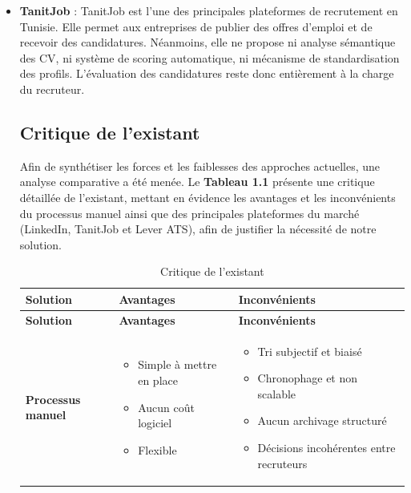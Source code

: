 \documentclass[12pt,a4paper,oneside]{report}
\begin{document}
\begin{itemize}
\item \textbf{TanitJob} : TanitJob \cite{tanitjob} est l'une des principales plateformes de recrutement en Tunisie. Elle permet aux entreprises de publier des offres d'emploi et de recevoir des candidatures. Néanmoins, elle ne propose ni analyse sémantique des CV, ni système de scoring automatique, ni mécanisme de standardisation des profils. L'évaluation des candidatures reste donc entièrement à la charge du recruteur.



\subsection{Critique de l'existant}
Afin de synthétiser les forces et les faiblesses des approches actuelles, une analyse comparative a été menée. Le \textbf{Tableau 1.1} présente une critique détaillée de l'existant, mettant en évidence les avantages et les inconvénients du processus manuel ainsi que des principales plateformes du marché (LinkedIn, TanitJob et Lever ATS), afin de justifier la nécessité de notre solution.

\renewcommand{\arraystretch}{1.8}
\begin{longtable}{|p{2.2cm}|p{5.1cm}|p{6cm}|}
\caption{Critique de l'existant} \label{tab:analyse_solutions} \\
\hline
\textbf{Solution} & \textbf{Avantages} & \textbf{Inconvénients} \\
\hline
\endfirsthead

\hline
\textbf{Solution} & \textbf{Avantages} & \textbf{Inconvénients} \\
\hline
\endhead

\hline
\endfoot

\hline
\endlastfoot

\textbf{Processus manuel} &  
\begin{itemize}[leftmargin=*,noitemsep,topsep=0pt,partopsep=0pt,parsep=0pt]
    \item Simple à mettre en place
    \item Aucun coût logiciel
    \item Flexible
\end{itemize} &  
\begin{itemize}[leftmargin=*,noitemsep,topsep=0pt,partopsep=0pt,parsep=0pt]
    \item Tri subjectif et biaisé
    \item Chronophage et non scalable
    \item Aucun archivage structuré
    \item Décisions incohérentes entre recruteurs
\end{itemize} \\
\hline


\end{longtable}
\end{itemize}
\end{document}
